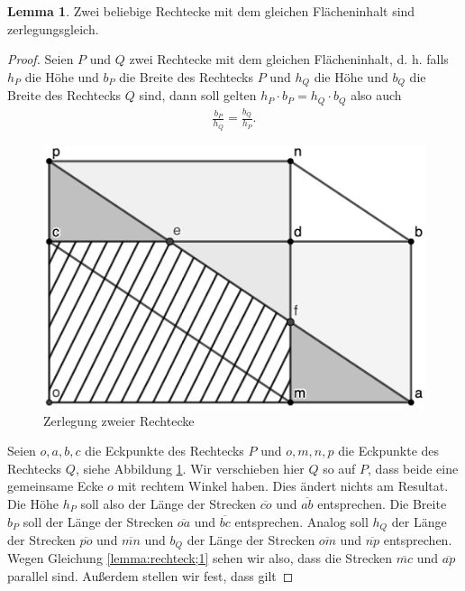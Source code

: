\documentclass[11pt,titlepage]{article}
\theoremstyle{definition}
\newtheorem{lemma}[theorem]{Lemma}
\theoremstyle{remark}
\begin{document}
	\begin{lemma} \label{lemma:rechtecke}
		Zwei beliebige Rechtecke mit dem gleichen Flächeninhalt sind zerlegungsgleich.
	\end{lemma}
	
	\begin{proof}
		Seien $P$ und $Q$ zwei Rechtecke mit dem gleichen Flächeninhalt, d. h. falls $h_P$ die Höhe und 
		$b_P$ die Breite des Rechtecks $P$ und $h_Q$ die Höhe und $b_Q$ die Breite des Rechtecks $Q$ sind, 
		dann soll gelten $h_P \cdot b_P = h_Q \cdot b_Q$ also auch
		\begin{align}
			\frac{b_P}{h_Q}=\frac{b_Q}{h_P}. \label{lemma:rechteck;1}
		\end{align}
		\begin{figure}[!htbp]
			\centering
			\includegraphics[scale=1.4]{Rechteck}
			\caption{Zerlegung zweier Rechtecke}
			\label{Abb.2}
		\end{figure}
		Seien $o,a,b,c$ die Eckpunkte des Rechtecks $P$ und $o,m,n,p$ die Eckpunkte des Rechtecks $Q$, siehe 
		Abbildung \ref{Abb.2}. 
		Wir verschieben hier $Q$ so auf $P$, dass beide eine gemeinsame Ecke $o$ mit rechtem Winkel haben. 
		Dies ändert nichts am Resultat. 
		Die Höhe $h_P$ soll also der Länge der Strecken $\overline{co}$ und $\overline{ab}$ entsprechen. Die 
		Breite $b_P$ soll der Länge der Strecken $\overline{oa}$ und $\overline{bc}$ entsprechen. Analog soll 
		$h_Q$ der Länge der Strecken $\overline{po}$ und $\overline{mn}$ und $b_Q$ der Länge der Strecken 
		$\overline{om}$ und $\overline{np}$ entsprechen. Wegen Gleichung  \ref{lemma:rechteck;1} sehen wir also, dass 
		die Strecken $\overline{mc}$ und $\overline{ap}$ parallel sind. Außerdem stellen wir fest, dass gilt

\end{proof}
\end{document}

